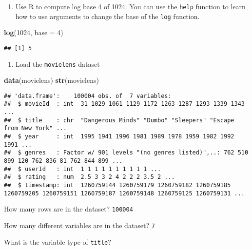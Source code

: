 \documentclass[]{article}
\newenvironment{Shaded}{\begin{snugshade}}{\end{snugshade}}
\newcommand{\DataTypeTok}[1]{\textcolor[rgb]{0.13,0.29,0.53}{#1}}
\newcommand{\DecValTok}[1]{\textcolor[rgb]{0.00,0.00,0.81}{#1}}
\newcommand{\KeywordTok}[1]{\textcolor[rgb]{0.13,0.29,0.53}{\textbf{#1}}}
\newcommand{\NormalTok}[1]{#1}
\providecommand{\tightlist}{%
  \setlength{\itemsep}{0pt}\setlength{\parskip}{0pt}}
\begin{document}
\begin{enumerate}
\def\labelenumi{\arabic{enumi}.}
\setcounter{enumi}{1}
\tightlist
\item
  Use R to compute log base 4 of 1024. You can use the \texttt{help}
  function to learn how to use arguments to change the base of the
  \texttt{log} function.
\end{enumerate}

\begin{Shaded}
\begin{Highlighting}[]
\KeywordTok{log}\NormalTok{(}\DecValTok{1024}\NormalTok{, }\DataTypeTok{base =} \DecValTok{4}\NormalTok{)}
\end{Highlighting}
\end{Shaded}

\begin{verbatim}
## [1] 5
\end{verbatim}

\begin{enumerate}
\def\labelenumi{\arabic{enumi}.}
\setcounter{enumi}{2}
\tightlist
\item
  Load the \texttt{movielens} dataset
\end{enumerate}

\begin{Shaded}
\begin{Highlighting}[]
\KeywordTok{data}\NormalTok{(movielens)}
\KeywordTok{str}\NormalTok{(movielens)}
\end{Highlighting}
\end{Shaded}

\begin{verbatim}
## 'data.frame':    100004 obs. of  7 variables:
##  $ movieId  : int  31 1029 1061 1129 1172 1263 1287 1293 1339 1343 ...
##  $ title    : chr  "Dangerous Minds" "Dumbo" "Sleepers" "Escape from New York" ...
##  $ year     : int  1995 1941 1996 1981 1989 1978 1959 1982 1992 1991 ...
##  $ genres   : Factor w/ 901 levels "(no genres listed)",..: 762 510 899 120 762 836 81 762 844 899 ...
##  $ userId   : int  1 1 1 1 1 1 1 1 1 1 ...
##  $ rating   : num  2.5 3 3 2 4 2 2 2 3.5 2 ...
##  $ timestamp: int  1260759144 1260759179 1260759182 1260759185 1260759205 1260759151 1260759187 1260759148 1260759125 1260759131 ...
\end{verbatim}

How many rows are in the dataset? \texttt{100004}

How many different variables are in the dataset? \texttt{7}

What is the variable type of \texttt{title}?
\end{document}
